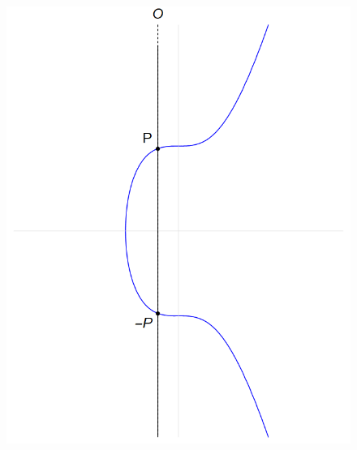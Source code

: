 \documentclass[../../tesis_maestria]{subfiles}
\begin{document}
\begin{figure}\centering
\begin{minipage}[t]{0.3\textwidth}
	\includegraphics[width=\textwidth]{figuras/suma_eliptica_0}
\end{minipage}
\begin{minipage}[t]{0.3\textwidth}

\end{minipage}
\end{figure}
\end{document}
